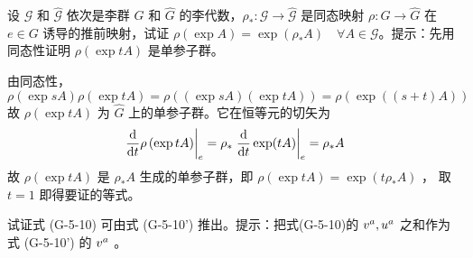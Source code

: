 \begin{xiti}
    \item 设 $\mathscr{G}$ 和 $\hat{\mathscr{G}}$ 依次是李群 $G$ 和 $\hat{G}$ 的李代数，$\rho_* \colon \mathscr{G} \rightarrow \hat{\mathscr{G}}$ 是同态映射 $\rho\colon G\rightarrow \hat{G}$ 在 $e\in G$ 诱导的推前映射，试证 $\rho \left(\exp A\right) = \exp(\rho_* A) \quad \forall A \in \mathscr{G}$。提示：先用同态性证明 $\rho \left(\exp tA\right)$ 是单参子群。

    \begin{zm}
    	由同态性，
    	\begin{displaymath}
    	\rho \left(\exp sA\right) \rho \left(\exp tA\right) = \rho \left(\left(\exp sA\right)\left(\exp tA\right)\right) = \rho \left(\exp((s+t)A)\right)
    	\end{displaymath}
    	故 $\rho \left(\exp tA\right)$ 为 $\hat{G}$ 上的单参子群。它在恒等元的切矢为
    	\begin{displaymath}
    	\left.\dv{t} \rho \left(\exp t A\right) \right|_e = \rho_* \left. \dv{t} \exp(tA) \right|_e = \rho_* A
    	\end{displaymath}
    	故 $\rho\left(\exp tA\right)$ 是 $\rho_* A$ 生成的单参子群，即 $\rho\left(\exp tA\right)=\exp(t\rho_* A)$ ， 取 $t=1$ 即得要证的等式。
    \end{zm}

	\item 试证式 (G-5-10) 可由式 (G-5-10') 推出。提示：把式(G-5-10)的 $\tensor{v}{^a},\tensor{u}{^a}$ 之和作为式 (G-5-10') 的 $\tensor{v}{^a}$ 。


\end{xiti}
